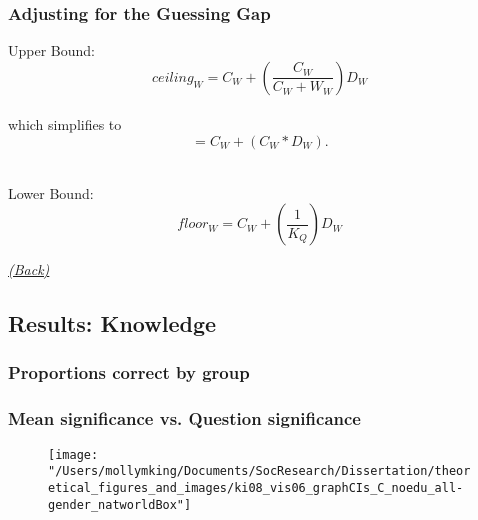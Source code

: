 \documentclass[pdf]{beamer}
\begin{document}
\begin{frame}
\label{guessing_gap_adjustment}
\frametitle{Adjusting for the Guessing Gap}
Upper Bound:
  $$ ceiling_W = C_W + (\frac{C_W}{C_W + W_W})D_W $$ \\
  which simplifies to $$ = C_W + (C_W * D_W). $$ \\
\vspace{1.3 cm}

Lower Bound:
  $$ floor_W =  C_W + (\frac{1}{K_Q})D_W $$
  \begin{flushright}
    \emph{\scriptsize{\textcolor{gray}{\hyperlink{supplemental_slides}{(Back)}}}}
  \end{flushright}
\end{frame}


\subsection{Results: Knowledge}

\subsubsection{Proportions correct by group}

\begin{frame}
\frametitle{Mean significance vs. Question significance}
\label{meanVSquestion}
  \begin{figure}[ht]
   \begin{center}
     \texttt{[image: "/Users/mollymking/Documents/SocResearch/Dissertation/theoretical\_figures\_and\_images/ki08\_vis06\_graphCIs\_C\_noedu\_all-gender\_natworldBox"]}
   \end{center}
  \end{figure}
\end{frame}
\end{document}
